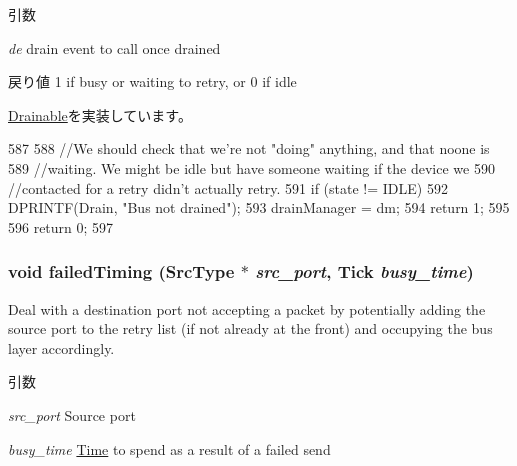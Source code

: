\begin{DoxyParams}{引数}
\item[{\em de}]drain event to call once drained\end{DoxyParams}
\begin{DoxyReturn}{戻り値}
1 if busy or waiting to retry, or 0 if idle 
\end{DoxyReturn}


\hyperlink{classDrainable_a1ed42c14f2f622ea6b0df3865e89c8b4}{Drainable}を実装しています。


\begin{DoxyCode}
587 {
588     //We should check that we're not "doing" anything, and that noone is
589     //waiting. We might be idle but have someone waiting if the device we
590     //contacted for a retry didn't actually retry.
591     if (state != IDLE) {
592         DPRINTF(Drain, "Bus not drained\n");
593         drainManager = dm;
594         return 1;
595     }
596     return 0;
597 }
\end{DoxyCode}
\hypertarget{classBaseBus_1_1Layer_a024ba069e31ed6c6b68dc003c9613bc2}{
\subsubsection[{failedTiming}]{\setlength{\rightskip}{0pt plus 5cm}void failedTiming (SrcType $\ast$ {\em src\_\-port}, \/  {\bf Tick} {\em busy\_\-time})}}
\label{classBaseBus_1_1Layer_a024ba069e31ed6c6b68dc003c9613bc2}
Deal with a destination port not accepting a packet by potentially adding the source port to the retry list (if not already at the front) and occupying the bus layer accordingly.


\begin{DoxyParams}{引数}
\item[{\em src\_\-port}]Source port \item[{\em busy\_\-time}]\hyperlink{classTime}{Time} to spend as a result of a failed send \end{DoxyParams}



